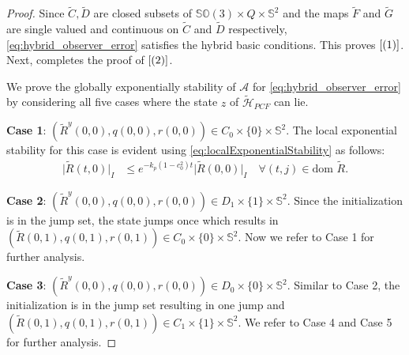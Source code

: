 \documentclass{article}
\newcommand{\dom}{\text{dom }}
\newcommand{\SOthree}{\mathbb{SO}(3)}
\newcommand{\Rtilde}{\tilde{R}}
\newcommand{\normSOthree}[1]{{{\vert}#1 {\vert}_I}}
\newcommand{\expo}[1]{e^{#1}}
\begin{document}
    \begin{proof}
         Since $\tilde{C}, \tilde{D}$ are closed subsets of ${\SOthree\times Q \times \mathbb{S}^2}$ and the maps $\tilde{F}$ and $\tilde{G}$ are single valued and continuous on $\tilde{C}$ and $\tilde{D}$ respectively, \eqref{eq:hybrid_observer_error} satisfies the hybrid basic conditions. This proves $\eqref{(1)}$. Next, \cite[Proposition 6.10]{hybridDynamicalSystems} completes the proof of $\eqref{(2)}$. 
    
  We prove the globally exponentially stability of $\mathcal{A}$ for \eqref{eq:hybrid_observer_error} by considering all five cases where the state $z$ of $\tilde{\mathcal{H}}_{PCF}$ can lie. 

\textbf{Case 1}: ${(\Rtilde^y(0,0), q(0,0), r(0,0))} \in C_0\times \{0\}\times\mathbb{S}^2$. The local exponential stability for this case is evident using \eqref{eq:localExponentialStability} as follows:
\begin{align}\label{eq:C0bounds}
    \normSOthree{\Rtilde(t,0)} &\leq \expo{-k_p(1-c_0^2)t}\normSOthree{\Rtilde(0,0)} \quad \forall (t,j) \in \dom\Rtilde.
\end{align}

    \textbf{Case 2}: ${(\Rtilde^y(0,0), q(0,0), r(0,0))}\in D_1\times\{1\}\times\mathbb{S}^2$. Since the initialization is in the jump set, the state jumps once which results in ${(\Rtilde(0,1), q(0,1), r(0,1))}\in C_0\times \{0\}\times \mathbb{S}^2$. Now we refer to Case 1 for further analysis.

    \textbf{Case 3}: ${(\Rtilde^y(0,0), q(0,0), r(0,0))}\in D_0\times\{0\} \times \mathbb{S}^2$. Similar to Case 2, the initialization is in the jump set resulting in one jump and ${(\Rtilde(0,1), q(0,1), r(0,1))}\in C_1\times\{1\}\times \mathbb{S}^2$. We refer to Case 4 and Case 5 for further analysis.


\end{proof}
\end{document}
